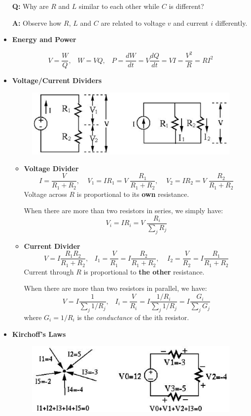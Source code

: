 \documentclass[12pt]{article}
\begin{document}
\begin{itemize}
      {\bf Q:} Why are $R$ and $L$ similar to each other while $C$ is different?

      {\bf A:} Observe how $R$, $L$ and $C$ are related to voltage $v$ and current
      $i$ differently.
  
    \item {\bf Energy and Power}

      \[ V=\frac{W}{Q},\;\;\;W=VQ,\;\;\;P=\frac{dW}{dt}=V \frac{dQ}{dt}=VI=\frac{V^2}{R}=RI^2 \]

    \item {\bf Voltage/Current Dividers}

      \begin{figure}
	\includegraphics[scale=0.5]{figures/dividers.eps}
      \end{figure}
      \begin{itemize}
      \item {\bf Voltage Divider}
	\[ I=\frac{V}{R_1+R_2},\;\;\;\;V_1=IR_1=V\;\frac{R_1}{R_1+R_2},\;\;\;\;
	V_2=IR_2=V\;\frac{R_2}{R_1+R_2} \]
	Voltage across $R$ is proportional to its {\bf own} resistance.

	When there are more than two resistors in series, we simply have:
	\[ V_i=IR_i=V\;\frac{R_i}{\sum_j R_j} \]

      \item {\bf Current Divider}
	\[ V=I\frac{R_1R_2}{R_1+R_2},\;\;\;I_1=\frac{V}{R_1}=I\frac{R_2}{R_1+R_2},
	\;\;\;\;I_2=\frac{V}{R_2}=I\frac{R_1}{R_1+R_2}  \]
	Current through $R$ is proportional to {\bf the other} resistance.

	When there are more than two resistors in parallel, we have:
	\[ V=I\frac{1}{\sum_j 1/R_j},\;\;\;I_i=\frac{V}{R_i}=I\frac{1/R_i}{\sum_j 1/R_j}
	=I\frac{G_i}{\sum_j G_j} \]
	where $G_i=1/R_i$ is the {\em conductance} of the ith resistor.

      \end{itemize}
      
      \newpage
    \item {\bf Kirchoff's Laws}
      
      \begin{figure}
	\includegraphics[scale=0.5]{figures/Kirchoff.eps}
      \end{figure}
      

\end{itemize}
\end{document}
